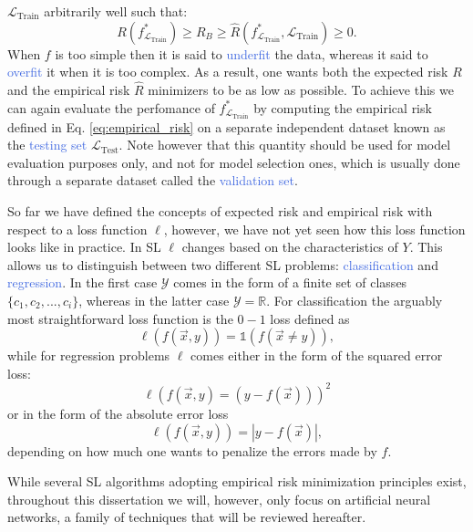 $\mathcal{L}_{\text{Train}}$ arbitrarily well such that:
\begin{equation}
	R(f^{*}_{\mathcal{L}_{\text{Train}}}) \geq R_B \geq \hat{R}(f^{*}_{\mathcal{L}_{\text{Train}}},\mathcal{L}_{\text{Train}}) \geq 0.
\end{equation}
When $f$ is too simple then it is said to \textcolor{RoyalBlue}{underfit} the data, whereas it said to \textcolor{RoyalBlue}{overfit} it when it is too complex. As a result, one wants both the expected risk $R$ and the empirical risk $\hat{R}$ minimizers to be as low as possible. To achieve this we can again evaluate the perfomance of $f^{*}_{\mathcal{L}_{\text{Train}}}$ by computing the empirical risk defined in Eq. \ref{eq:empirical_risk} on a separate independent dataset known as the \textcolor{RoyalBlue}{testing set} $\mathcal{L}_{\text{Test}}$. Note however that this quantity should be used for model evaluation purposes only, and not for model selection ones, which is usually done through a separate dataset called the \textcolor{RoyalBlue}{validation set}. 

So far we have defined the concepts of expected risk and empirical risk with respect to a loss function $\ell$, however, we have not yet seen how this loss function looks like in practice. In SL $\ell$ changes based on the characteristics of $Y$. This allows us to distinguish between two different SL problems: \textcolor{RoyalBlue}{classification} and \textcolor{RoyalBlue}{regression}. In the first case $\mathcal{Y}$ comes in the form of a finite set of classes $\{c_1, c_2,...,c_i\}$, whereas in the latter case $\mathcal{Y}=\mathds{R}$. For classification the arguably most straightforward loss function is the $0-1$ loss defined as 
\begin{equation}
	\ell(f(\vec{x},y)) = \mathbb{1}(f(\vec{x}\neq y)),
\end{equation}
while for regression problems $\ell$ comes either in the form of the squared error loss:
\begin{equation}
	\ell(f(\vec{x},y)=(y-f(\vec{x})))^2
\end{equation}
or in the form of the absolute error loss
\begin{equation}
	\ell(f(\vec{x},y))=|y-f(\vec{x})|,
\end{equation}
depending on how much one wants to penalize the errors made by $f$.

While several SL algorithms adopting empirical risk minimization principles exist, throughout this dissertation we will, however, only focus on artificial neural networks, a family of techniques that will be reviewed hereafter.  

